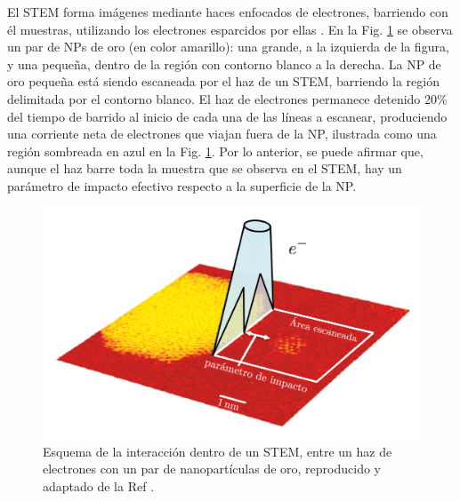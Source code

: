 \documentclass[letter,12pt]{article}
\numberwithin{equation}{section}
\begin{document}
El STEM forma imágenes mediante haces enfocados de electrones, barriendo con él muestras, utilizando los electrones esparcidos por ellas \cite{Batson}. En la Fig. \ref{fig: Batson STEM} se observa un par de NPs de oro (en color amarillo): una grande, a la izquierda de la figura, y una pequeña, dentro de la región con contorno blanco a la derecha. La NP de oro pequeña está siendo escaneada por el haz de un STEM, barriendo la región delimitada por el contorno blanco. El haz de electrones permanece detenido 20\% del tiempo de barrido al inicio de cada una de las líneas a escanear, produciendo una corriente neta de electrones que viajan fuera de la NP, ilustrada como una región sombreada en azul en la Fig. \ref{fig: Batson STEM}. Por lo anterior, se puede afirmar que, aunque el haz barre toda la muestra que se observa en el STEM, hay un parámetro de impacto efectivo respecto a la superficie de la NP.

\begin{figure}[h!]
\centering
\includegraphics[width=0.6\linewidth]{17-imagenes/1-Intro/STEM}
\caption{\label{fig: Batson STEM} Esquema de la interacción dentro de un STEM, entre un haz de electrones con un par de nanopartículas de oro, reproducido y adaptado de la Ref \cite{Batson}.} 
\end{figure}
\end{document}
